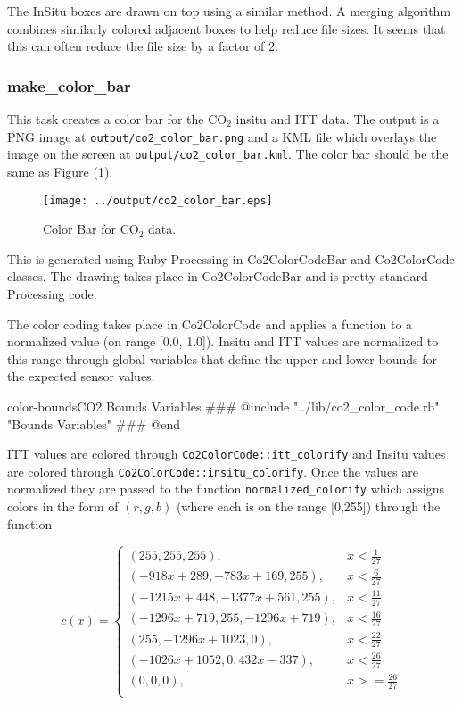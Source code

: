 \documentclass[12pt]{article}
\begin{document}
The InSitu boxes are drawn on top using a similar method.  A merging algorithm combines similarly colored adjacent boxes to help reduce file sizes.  It seems that this can often reduce the file size by a factor of 2.

\subsubsection*{make\_color\_bar}

This task creates a color bar for the CO$_2$ insitu and ITT data.  The output is a PNG image at \texttt{output/co2\_color\_bar.png} and a KML file which overlays the image on the screen at \texttt{output/co2\_color\_bar.kml}.  The color bar should be the same as Figure (\ref{co2-color-bar}).   

\begin{figure}
\centering
\texttt{[image: ../output/co2\_color\_bar.eps]}
\caption{Color Bar for CO$_2$ data.}
\label{co2-color-bar}
\end{figure}

This is generated using Ruby-Processing in Co2ColorCodeBar and Co2ColorCode classes.  The drawing takes place in Co2ColorCodeBar and is pretty standard Processing code.  

The color coding takes place in Co2ColorCode and applies a function to a normalized value (on range [0.0, 1.0]).  Insitu and ITT values are normalized to this range through global variables that define the upper and lower bounds for the expected sensor values.

\begin{code}{color-bounds}{CO2 Bounds Variables}
### @include "../lib/co2_color_code.rb" "Bounds Variables"
### @end
\end{code}

ITT values are colored through \texttt{Co2ColorCode::itt\_colorify} and Insitu values are colored through \texttt{Co2ColorCode::insitu\_colorify}.  Once the values are normalized they are passed to the function \texttt{normalized\_colorify} which assigns colors in the form of $(r,g,b)$ (where each is on the range [0,255]) through the function

\begin{equation}
\label{normalized-colorify}
c(x)= \begin{cases}
(255,255,255), & x < \frac{1}{27} \\
(-918x+289,-783x+169,255), & x < \frac{6}{27} \\
(-1215x+448,-1377x+561,255), & x < \frac{11}{27} \\
(-1296x+719,255,-1296x+719), & x < \frac{16}{27} \\
(255,-1296x+1023,0), & x < \frac{22}{27} \\
(-1026x+1052,0,432x-337), & x < \frac{26}{27} \\
(0,0,0), & x >= \frac{26}{27} \\
\end{cases}
\end{equation}
\end{document}
